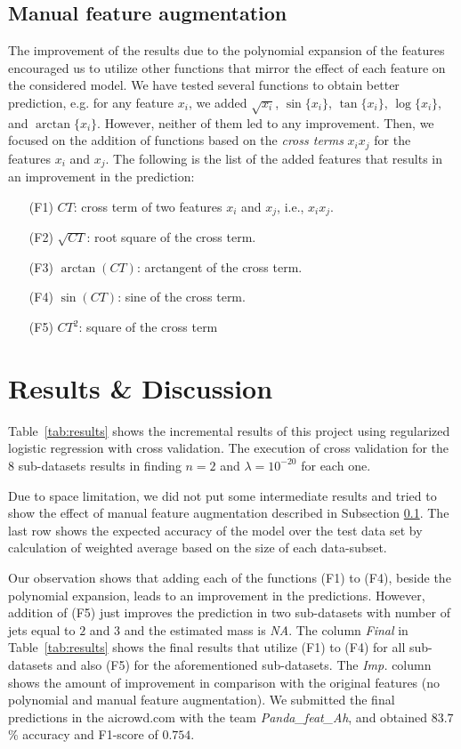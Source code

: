 \documentclass[8pt,conference,compsocconf]{IEEEtran}
\begin{document}
\subsection{Manual feature augmentation}\label{sec:man_feature}
The improvement of the results due to the polynomial expansion of the features encouraged us to utilize other functions that mirror the effect of each feature on the considered model. We have tested several functions to obtain better prediction, e.g. for any feature $x_i$, we added $\sqrt{x_i}$, $\sin\{x_i\}$, $\tan\{x_i\}$, $\log\{x_i\}$, and $\arctan\{x_i\}$. However, neither of them led to any improvement. Then, we focused on the addition of functions based on the \textit{cross terms} $x_i x_j$ for the features $x_i$ and $x_j$. The following is the list of the added features that results in an improvement in the prediction:
\begin{itemize}
	\item[(F1)] $CT$: cross term of two features $x_i$ and $x_j$, i.e., $x_i x_j$.
	\item[(F2)] $\sqrt{CT}$: root square of the cross term.
	\item[(F3)] $\arctan(CT)$: arctangent of the cross term.
	\item[(F4)] $\sin(CT)$: sine of the cross term.
	\item[(F5)] $CT^2$: square of the cross term
\end{itemize}


\section{Results \& Discussion} \label{sec:results}
Table~\ref{tab:results} shows the incremental results of this project using regularized logistic regression with cross validation. The execution of cross validation for the $8$ sub-datasets results in finding $n=2$ and $\lambda=10^{-20}$ for each one. 

Due to space limitation, we did not put some intermediate results and tried to show the effect of manual feature augmentation described in Subsection \ref{sec:man_feature}. The last row shows the expected accuracy of the model over the test data set by calculation of weighted average based on the size of each data-subset.

Our observation shows that adding each of the functions (F1) to (F4), beside the polynomial expansion, leads to an improvement in the predictions. However, addition of (F5)  just improves the prediction in two sub-datasets with number of jets equal to $2$ and $3$ and the estimated mass is \textit{NA}. The column \textit{Final} in Table~\ref{tab:results} shows the final results that utilize (F1) to (F4) for all sub-datasets and also (F5) for the aforementioned sub-datasets. The \textit{Imp.} column shows the amount of improvement in comparison with the original features (no polynomial and manual feature augmentation). We submitted the final predictions in the aicrowd.com with the team \textit{Panda\_feat\_Ah}, and obtained $83.7$\% accuracy and F1-score of $0.754$.
\end{document}
